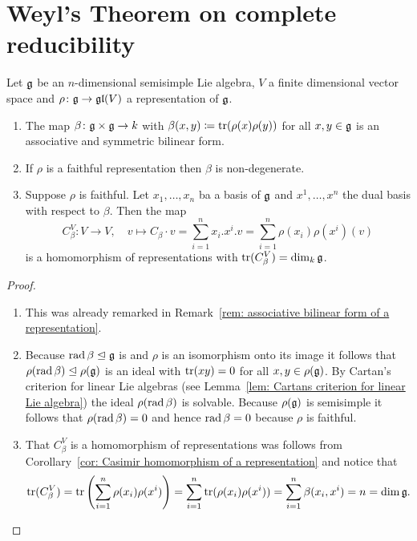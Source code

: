 \section{Weyl’s Theorem on complete reducibility}


\begin{lem}\label{lem: Casimirs endomorphism for Weyl}
 Let $\mathfrak{g}$ be an $n$-dimensional semisimple Lie algebra, $V$ a finite dimensional vector space and $\rho \colon \mathfrak{g} \to \mathfrak{gl}(V)$ a representation of $\mathfrak{g}$.
 \begin{enumerate}
  \item
   The map $\beta \colon \mathfrak{g} \times \mathfrak{g} \to k$ with $\beta(x,y) \coloneqq \operatorname{tr}(\rho(x)\rho(y))$ for all $x,y \in \mathfrak{g}$ is an associative and symmetric bilinear form.
  \item
   If $\rho$ is a faithful representation then $\beta$ is non-degenerate.
  \item
   Suppose $\rho$ is faithful. Let $x_1, \dotsc, x_n$ ba a basis of $\mathfrak{g}$ and $x^1, \dotsc, x^n$ the dual basis with respect to $\beta$. Then the map
   \[
    C_\beta^V \colon V \to V,
    \quad
    v \mapsto C_\beta \cdot v = \sum_{i=1}^n x_i.x^i.v = \sum_{i=1}^n \rho(x_i)\rho(x^i)(v)
   \]
   is a homomorphism of representations with $\operatorname{tr}(C_\beta^V) = \dim_k \mathfrak{g}$.
 \end{enumerate}
\end{lem}
\begin{proof}
 \begin{enumerate}[leftmargin=*]
  \item
   This was already remarked in Remark~\ref{rem: associative bilinear form of a representation}.
  \item
   Because $\operatorname{rad} \beta \trianglelefteq \mathfrak{g}$ is and $\rho$ is an isomorphism onto its image it follows that $\rho(\operatorname{rad} \beta) \trianglelefteq \rho(\mathfrak{g})$ is an ideal with $\operatorname{tr}(xy) = 0$ for all $x,y \in \rho(\mathfrak{g})$. By Cartan’s criterion for linear Lie algebras (see Lemma~\ref{lem: Cartans criterion for linear Lie algebra}) the ideal $\rho(\operatorname{rad} \beta)$ is solvable. Because $\rho(\mathfrak{g})$ is semisimple it follows that $\rho(\operatorname{rad} \beta) = 0$ and hence $\operatorname{rad} \beta = 0$ because $\rho$ is faithful.
  \item
   That $C_\beta^V$ is a homomorphism of representations was follows from Corollary~\ref{cor: Casimir homomorphism of a representation} and notice that
   \[
    \operatorname{tr}(C_\beta^V)
    = \operatorname{tr}\left( \sum_{i=1}^n \rho(x_i)\rho(x^i) \right)
    = \sum_{i=1}^n \operatorname{tr}(\rho(x_i)\rho(x^i))
    = \sum_{i=1}^n \beta(x_i, x^i)
    = n
    = \dim \mathfrak{g}.
    \qedhere
   \]
 \end{enumerate}
\end{proof}


